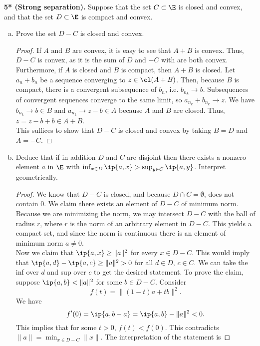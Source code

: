 \documentclass[12pt, letterpaper]{article}
\numberwithin{equation}{subsection}
\begin{document}
\textbf{5* (Strong separation).} Suppose that the set $C\subset\E$ is 
closed and convex, and that the set $D\subset\E$ is compact and 
convex.
\begin{enumerate}[(a)]
\item Prove the set $D-C$ is closed and convex. 
\begin{proof}
If $A$ and $B$ are convex, it is easy to see that $A+B$ is convex. 
Thus, $D-C$ is convex, as it is the sum of $D$ and $-C$ with are 
both convex. \\
Furthermore, if $A$ is closed and $B$ is compact,
then $A+B$ is closed.
Let \(a_n+b_n\) be a sequence converging to \(z\in \cl(A+B)\). Then, because \(B\) is compact, there is a convergent subsequence of \(b_n\), i.e. \(b_{n_k}\to b\). Subsequences of convergent sequences converge to the same limit, so \(a_{n_k}+b_{n_k} \to z\). We have \(b_{n_k}\to b\in B\) and \(a_{n_k} \to z-b\in A\) because \(A\) and \(B\) are closed. Thus, \(z=z-b+b\in A+B\). \\
This suffices to show that $D-C$ is closed and convex by taking 
$B=D$ and $A= -C$.
\end{proof}
\item Deduce that if in addition $D$ and $C$ are disjoint then there 
exists a nonzero element $a$ in $\E$ with $\inf_{x\in D}\ip{a,x}
> \sup_{y\in C} \ip{a,y}$. Interpret geometrically. 
\begin{proof}
We know that $D-C$ is closed, and because $D\cap C=\emptyset$, does not 
contain 0. We claim there exists an element of $D-C$ of minimum norm.
Because we are minimizing the norm, we may intersect $D-C$ with the ball 
of radius $r$, where $r$ is the norm of an arbitrary element in $D-C$. 
This yields a compact set, and since the norm is continuous there is 
an element of minimum norm $a\neq0$.\\
Now we claim that $\ip{a,x}\geq\|a\|^2$ for every $x\in D-C$. This would 
imply that $\ip{a,d}-\ip{a,c} \geq \|a\|^2>0$ for all $d\in D,\,c\in C$.
We can take the inf over $d$ and sup over $c$ to get the desired statement.
To prove the claim, suppose $\ip{a,b}<\|a\|^2$ for some $b\in D-C$. Consider
\begin{equation*}
f(t) = \|(1-t)a + tb\|^2.
\end{equation*}
We have 
\begin{equation*}
f'(0) = \ip{a, b-a} = \ip{a,b}-\|a\|^2 < 0.
\end{equation*}
This implies that for some $t>0$, $f(t) < f(0)$. This contradicts 
$\|a\| = \min_{x\in D-C}\|x\|$. The interpretation of the statement is 

\end{proof}
\end{enumerate}
\end{document}
